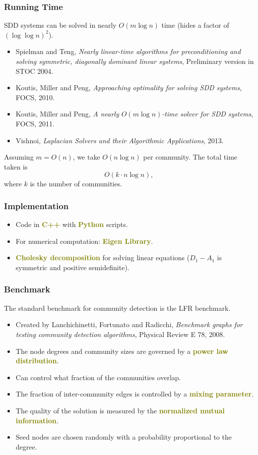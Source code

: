 \documentclass[xcolor=table]{beamer}
\newcommand{\highlight}[1]{\textcolor{olive}{\textbf{#1}}}
\begin{document}
\begin{frame}[t]
\frametitle{Running Time}
SDD systems can be solved in nearly $O(m \log n)$ time (hides a factor of $(\log \log n)^2$). 
\begin{itemize}
	\item Spielman and Teng, \emph{Nearly linear-time algorithms for preconditioning
		and solving symmetric, diagonally dominant linear systems}, Preliminary version 
		in STOC 2004.
	
	\item Koutis, Miller and Peng, \emph{Approaching optimality for solving SDD systems}, 
		FOCS, 2010.

	\item Koutis, Miller and Peng, \emph{A nearly $O(m \log n)$-time solver for SDD systems}, 
		FOCS, 2011.
	
	\item Vishnoi, \emph{Laplacian Solvers and their Algorithmic Applications}, 2013.
\end{itemize}

Assuming $m = O(n)$, we take $O(n \log n)$ per community. The total time taken is
\[
	O(k \cdot n \log n),
\]
where $k$ is the number of communities.
\end{frame}

\begin{frame}[t]
\frametitle{Implementation}
\begin{itemize}
	\item Code in \highlight{C++} with \highlight{Python} scripts.
	\item For numerical computation: \highlight{Eigen Library}.
	\item \highlight{Cholesky decomposition} for solving linear equations ($D_1 - A_1$ 
		is symmetric and positive semidefinite).  
\end{itemize}
\end{frame}
 
\begin{frame}[t]
\frametitle{Benchmark}
The standard benchmark for community detection is the LFR benchmark.
\begin{itemize}
	\item Created by Lanchichinetti, Fortunato and Radicchi, \emph{Benchmark graphs for 
		testing community detection algorithms}, Physical Review E 78, 2008.
	\item The node degrees and community sizes are governed by a \highlight{power law distribution}.
	\item Can control what fraction of the communities overlap.
	\item The fraction of inter-community edges is controlled by a \highlight{mixing parameter}.
	\item The quality of the solution is measured by the \highlight{normalized mutual information}.
	\item Seed nodes are chosen randomly with a probability proportional to the degree.
\end{itemize}
\end{frame}
\end{document}
